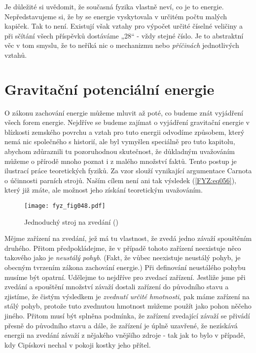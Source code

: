     Je důležité si uvědomit, že současná fyzika vlastně neví, co je to energie. Nepředstavujeme si, 
    že by se energie vyskytovala v určitém počtu malých kapiček. Tak to není. Existují však vztahy 
    pro výpočet určité číselné veličiny a při sčítání všech příspěvků dostáváme „\num{28}“ - vždy 
    stejné číslo. Je to abstraktní věc v tom smyslu, že to neříká nic o mechanizmu nebo 
    \emph{příčinách} jednotlivých vztahů.
    
  \section{Gravitační potenciální energie}
    O zákonu zachování energie můžeme mluvit až poté, co budeme znát vyjádření všech forem energie. 
    Nejdříve se budeme zajímat o vyjádření gravitační energie v blízkosti zemského povrchu a vztah 
    pro tuto energii odvodíme způsobem, který nemá nic společného s historií, ale byl vymyšlen 
    speciálně pro tuto kapitolu, abychom zdůraznili tu pozoruhodnou skutečnost, že důkladným 
    uvažováním můžeme o přírodě mnoho poznat i z malého množství faktů. Tento postup je ilustrací 
    práce teoretických fyziků. Za vzor slouží vynikající argumentace Carnota o účinnosti parních 
    strojů. Naším cílem není ani tak výsledek (\ref{FYZ:eq056}), který již znáte, ale možnost jeho 
    získání teoretickým uvažováním.

    \begin{wrapfigure}[8]{r}{5cm}  %
      \centering
      \texttt{[image: fyz\_fig048.pdf]}
      \caption{Jednoduchý stroj na zvedání (\cite[s.~52]{Feynman01})}
      \label{fyz:fig048}
    \end{wrapfigure}
    Mějme zařízení na zvedání, jež má tu vlastnost, že zvedá jedno závaží spouštěním druhého. 
    Přitom předpokládejme, že v případě tohoto zařízení neexistuje něco takového jako je 
    \emph{neustálý pohyb}. (Fakt, že vůbec neexistuje neustálý pohyb, je obecným tvrzením zákona 
    zachování energie.) Při definování neustálého pohybu musíme být opatrní. Udělejme to nejdříve 
    pro zvedací zařízení. Jestliže jsme při zvedání a spouštění množství závaží dostali zařízení do 
    původního stavu a zjistíme, že čistým výsledkem je \emph{zvednutí určité hmotnosti}, pak máme 
    zařízení na stálý pohyb, protože tuto zvednutou hmotnost můžeme použít jako pohon něčeho 
    jiného. Přitom musí být splněna podmínka, že zařízení zvedající závaží se přivádí přesně do 
    původního stavu a dále, že zařízení je úplně uzavřené, že nezískává energii na zvedání závaží z 
    nějakého vnějšího zdroje - tak jak to bylo v případě, kdy Cipískovi nechal v pokoji kostky jeho 
    přítel.
    

